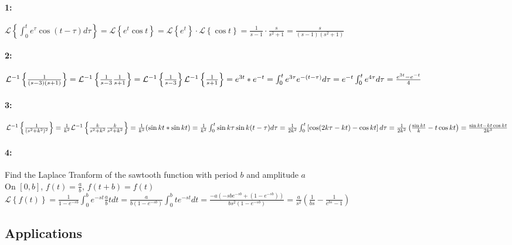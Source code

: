 \documentclass{article}
\begin{document}
\paragraph{1: }$\mathcal{L}\left\{\int_{0}^{t}e^\tau \cos (t-\tau)d\tau\right\} = \mathcal{L}\left\{e^t\cos t\right\}= \mathcal{L}\left\{e^t\right\}\cdot \mathcal{L}\left\{\cos t\right\} = \frac{1}{s-1} \cdot \frac{s}{s^2+1} = \frac{s}{(s-1)(s^2+1)}$
\\\paragraph{2: }$\mathcal{L}^{-1}\left\{\frac{1}{(s-3)(s+1)}\right\}=\mathcal{L}^{-1}\left\{\frac{1}{s-3}\frac{1}{s+1}\right\}=\mathcal{L}^{-1}\left\{\frac{1}{s-3}\right\}\mathcal{L}^{-1}\left\{\frac{1}{s+1}\right\}=e^{3t}*e^{-t}\\=\int_{0}^{t}e^{3\tau}e^{-(t-\tau)}d\tau=e^{-t}\int_{0}^{t}e^{4\tau}d\tau = \frac{e^{3t}-e^{-t}}{4}$
\\\paragraph{3: }$\mathcal{L}^{-1}\left\{\frac{1}{(s^2+k^2)^2}\right\}=\frac{1}{k^2}\mathcal{L}^{-1}\left\{\frac{k}{s^2+k^2}\frac{k}{s^2+k^2}\right\}=\frac{1}{k^2}(\sin kt * \sin kt)=\frac{1}{k^2}\int_{0}^{t}{\sin k\tau \sin k(t-\tau)d\tau}\\=\frac{1}{2k^2}\int_{0}^{t}\left[\cos (2k\tau-kt)-\cos kt \right]d\tau = \frac{1}{2k^2}\left(\frac{\sin kt}{k}-t\cos kt\right) = \frac{\sin kt - kt\cos kt }{2k^3}$
\\\paragraph{4: }Find the Laplace Tranform of the sawtooth function with period $b$ and amplitude $a$ \\On $[0,b]$, $f(t)=\frac{a}{b}$, $f(t+b)=f(t)$
\\$\mathcal{L}\left\{f(t)\right\}=\frac{1}{1-e^{-sb}}\int_{0}^{b}e^{-st}\frac{a}{b}tdt=\frac{a}{b(1-e^{-sb})}\int_{0}^{b}te^{-st}dt=\frac{-a(-sbe^{-sb}+(1-e^{-sb}))}{bs^2(1-e^{-sb})}=\frac{a}{s^2}\left(\frac{1}{bs}-\frac{1}{e^{bs}-1}\right)$

\subsection{Applications}
\end{document}
